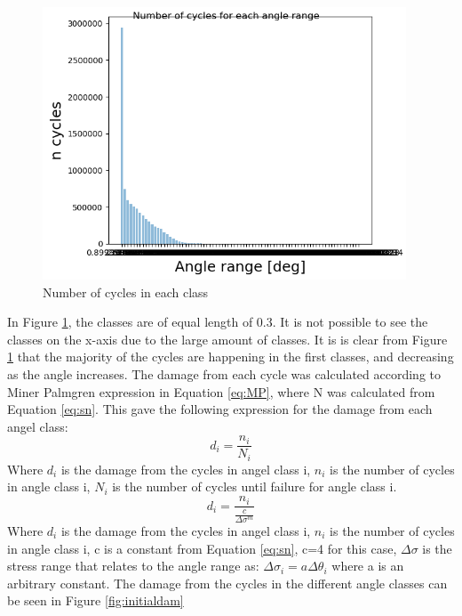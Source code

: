 \begin{figure}[H]
\centering
\includegraphics[scale=1]{figures/initialcyc}
\caption[Number of cycles in each class]{Number of cycles in each class}
 \label{fig:initialcyc}
\end{figure}

\noindent In Figure \ref{fig:initialcyc}, the classes are of equal length of 0.3. It is not possible to see the classes on the x-axis due to the large amount of classes. It is is clear from Figure \ref{fig:initialcyc} that the majority of the cycles are happening in the first classes, and decreasing as the angle increases.\newline
\newline
The damage from each cycle was calculated according to Miner Palmgren expression in Equation \ref{eq:MP}, where N was calculated from Equation \ref{eq:sn}. This gave the following expression for the damage from each angel class: 
\begin{equation}
    d_i  = \frac{n_i}{N_i}
\end{equation}
Where $d_i$ is the damage from the cycles in angel class i, $n_i$ is the number of cycles in angle class i, $N_i$ is the number of cycles until failure for angle class i.
\begin{equation}
    d_i=\frac{n_i}{\frac{c}{\Delta \sigma ^m}}
\end{equation}
Where $d_i$ is the damage from the cycles in angel class i, $n_i$ is the number of cycles in angle class i, c is a constant from Equation \ref{eq:sn}, c=4 for this case, $\Delta \sigma$ is the stress range that relates to the angle range as: $\Delta \sigma_i = a \Delta \theta_i$ where a is an arbitrary constant.\newline
\newline 
The damage from the cycles in the different angle classes can be seen in Figure \ref{fig:initialdam}

